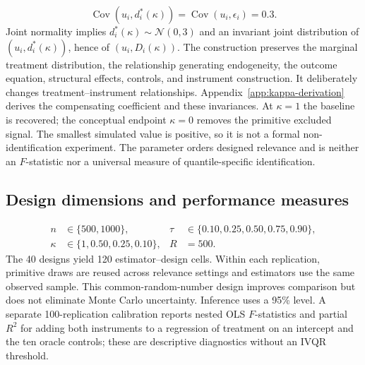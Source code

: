 \begin{equation}
  \operatorname{Cov}\!\left(u_i,d_i^*(\kappa)\right)
  =\operatorname{Cov}(u_i,\epsilon_i)=0.3.
  \label{eq:dgp-kappa-endogeneity}
\end{equation}
Joint normality implies $d_i^*(\kappa)\sim\mathcal N(0,3)$ and an invariant joint distribution of $(u_i,d_i^*(\kappa))$, hence of $(u_i,D_i(\kappa))$. The construction preserves the marginal treatment distribution, the relationship generating endogeneity, the outcome equation, structural effects, controls, and instrument construction. It deliberately changes treatment--instrument relationships. Appendix~\ref{app:kappa-derivation} derives the compensating coefficient and these invariances. At $\kappa=1$ the baseline is recovered; the conceptual endpoint $\kappa=0$ removes the primitive excluded signal. The smallest simulated value is positive, so it is not a formal non-identification experiment. The parameter orders designed relevance and is neither an $F$-statistic nor a universal measure of quantile-specific identification.

\subsection{Design dimensions and performance measures}
\label{sec:performance-measures}
\begin{equation}
  \begin{aligned}
    n&\in\{500,1000\},
    &\tau&\in\{0.10,0.25,0.50,0.75,0.90\},\\
    \kappa&\in\{1,0.50,0.25,0.10\},
    &R&=500.
  \end{aligned}
  \label{eq:simulation-design}
\end{equation}
The 40 designs yield 120 estimator--design cells. Within each replication, primitive draws are reused across relevance settings and estimators use the same observed sample. This common-random-number design improves comparison but does not eliminate Monte Carlo uncertainty. Inference uses a 95\% level. A separate 100-replication calibration reports nested OLS $F$-statistics and partial $R^2$ for adding both instruments to a regression of treatment on an intercept and the ten oracle controls; these are descriptive diagnostics without an IVQR threshold.

